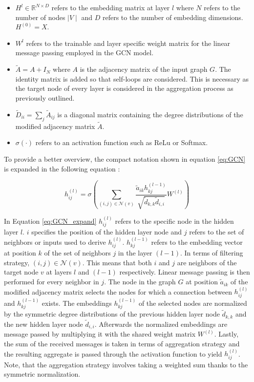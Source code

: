 	\begin{itemize}
		\item $H^{l}\in\mathbb{R}^{N \times D}$ refers to the embedding matrix
			at layer $l$ where $N$ refers to the number of nodes $\mid V \mid$
			and $D$ refers to the number of embedding dimensions. $H^{(0)}=X$.
		\item $W^{l}$ refers to the trainable and layer specific weight matrix
			for the linear message passing employed in the GCN model.
		\item $\tilde A = A + I_N$ where $A$ is the adjacency matrix of the
			input graph $G$. The identity matrix is added so that self-loops
			are considered. This is necessary as the target node of every layer
			is considered in the aggregation process as previously outlined.
		\item $\tilde D_{ii} = \sum_{j}\tilde A_{ij}$ is a diagonal matrix
			containing the degree distributions of the modified adjacency
			matrix $\tilde A$.
		\item $\sigma(\cdot)$ refers to an activation function such as ReLu or
			Softmax.
	\end{itemize}

	\noindent To provide a better overview, the compact notation shown in 
	equation \ref{eq:GCN} is expanded in the following equation
	\citep{Dubois2019}:

	\begin{equation}
		h_{ij}^{(l)} = \sigma\left(\sum_{(i,j)\in
		\mathcal{N}(v)}\frac{\tilde a_{ik}h_{kj}^{(l-1)}}{\sqrt{\tilde
d_{k,k}\tilde d_{i,i}}} W^{(l)}\right)
		\label{eq:GCN_expand}
	\end{equation}
	
	\noindent In Equation \ref{eq:GCN_expand} $h_{ij}^{(l)}$ refers to the 
	specific node in the hidden layer $l$. $i$ specifies the position of the
	hidden layer node and $j$ refers to the set of neighbors or inputs used to derive
	$h_{ij}^{(l)}$. $h_{kj}^{(l-1)}$ refers to the embedding vector at position
	$k$ of the set of neighbors $j$ in the layer $(l-1)$. In terms of filtering
	strategy, $(i,j) \in \mathcal{N}(v)$. This means that both $i$ and $j$ are
	neighbors of the target node $v$ at layers $l$ and $(l-1)$ respectively. Linear message
	passing is then performed for every neighbor in $j$. The node in the graph
	$G$ at position $\tilde a_{ik}$ of the modified adjacency matrix selects
	the nodes for which a connection between $h_{ij}^{(l)}$ and
	$h_{kj}^{(l-1)}$ exists. The embeddings $h_{kj}^{(l-1)}$ of the selected nodes are
	normalized by the symmetric degree distributions of the previous hidden
	layer node $\tilde d_{k,k}$ and the new hidden layer node $\tilde d_{i,i}$.
	Afterwards the normalized embeddings are message passed by multiplying it
	with the shared weight matrix $W^{(l)}$. Lastly, the sum of the received
	messages is taken in terms of aggregation strategy and the resulting
	aggregate is passed through the activation function to yield $h_{ij}^{(l)}$.
	Note, that the aggregation strategy involves taking a weighted sum thanks
	to the symmetric normalization. \\


